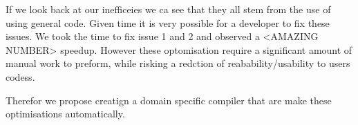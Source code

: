 If we look back at our inefficeies we ca see that they all stem from the use of using general code.
Given time it is very possible for a developer to fix these issues.
We took the time to fix issue 1 and 2 and observed a <AMAZING NUMBER> speedup.
However these optomisation require a significant amount of manual work to preform, while risking a redction of reabability/usability to users codess.

Therefor we propose creatign a domain specific compiler that are make these optimisations automatically.


